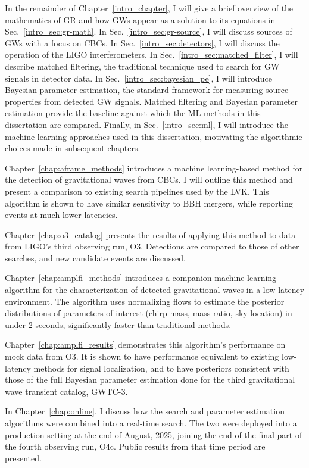 In the remainder of Chapter~\ref{intro_chapter}, I will give a brief overview of the mathematics of GR and how GWs appear as a solution to its equations in Sec.~\ref{intro_sec:gr-math}.
In Sec.~\ref{intro_sec:gr-source}, I will discuss sources of GWs with a focus on CBCs.
In Sec.~\ref{intro_sec:detectors}, I will discuss the operation of the LIGO interferometers.
In Sec.~\ref{intro_sec:matched_filter}, I will describe matched filtering, the traditional technique used to search for GW signals in detector data.
In Sec.~\ref{intro_sec:bayesian_pe}, I will introduce Bayesian parameter estimation, the standard framework for measuring source properties from detected GW signals.
Matched filtering and Bayesian parameter estimation provide the baseline against which the ML methods in this dissertation are compared.
Finally, in Sec.~\ref{intro_sec:ml}, I will introduce the machine learning approaches used in this dissertation, motivating the algorithmic choices made in subsequent chapters.

Chapter~\ref{chap:aframe_methods} introduces a machine learning-based method for the detection of gravitational waves from CBCs.
I will outline this method and present a comparison to existing search pipelines used by the LVK.
This algorithm is shown to have similar sensitivity to BBH mergers, while reporting events at much lower latencies.

Chapter~\ref{chap:o3_catalog} presents the results of applying this method to data from LIGO's third observing run, O3. 
Detections are compared to those of other searches, and new candidate events are discussed.

Chapter~\ref{chap:amplfi_methods} introduces a companion machine learning algorithm for the characterization of detected gravitational waves in a low-latency environment.
The algorithm uses normalizing flows to estimate the posterior distributions of parameters of interest (chirp mass, mass ratio, sky location) in under 2 seconds, significantly faster than traditional methods.

Chapter~\ref{chap:amplfi_results} demonstrates this algorithm's performance on mock data from O3.
It is shown to have performance equivalent to existing low-latency methods for signal localization, and to have posteriors consistent with those of the full Bayesian parameter estimation done for the third gravitational wave transient catalog, GWTC-3.

In Chapter~\ref{chap:online}, I discuss how the search and parameter estimation algorithms were combined into a real-time search.
The two were deployed into a production setting at the end of August, 2025, joining the end of the final part of the fourth observing run, O4c.
Public results from that time period are presented.

